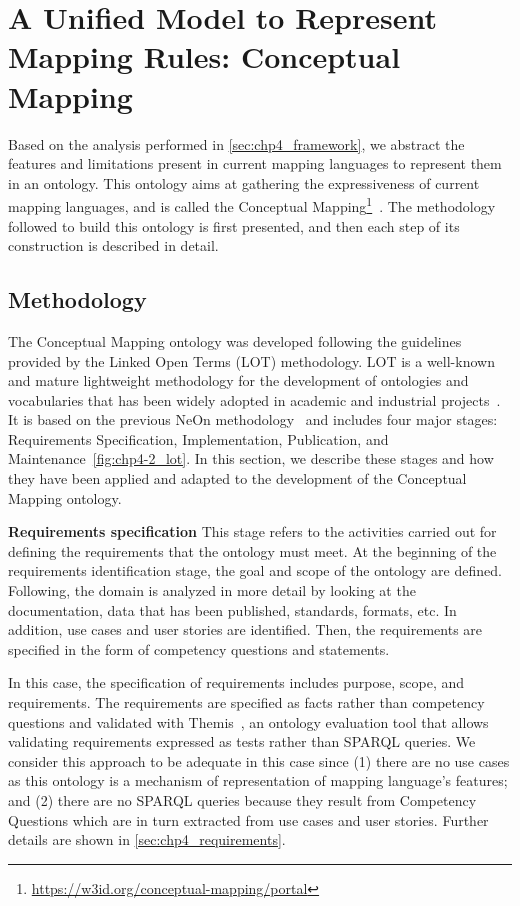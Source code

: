 \section{A Unified Model to Represent Mapping Rules: Conceptual Mapping}
\label{sec:chp4_cm_ontology}

Based on the analysis performed in \cref{sec:chp4_framework}, we abstract the features and limitations present in current mapping languages to represent them in an ontology. This ontology aims at gathering the expressiveness of current mapping languages, and is called the Conceptual Mapping\footnote{\label{foot:cmportal}\url{https://w3id.org/conceptual-mapping/portal}}~\parencite{iglesias2022cm}. The methodology followed to build this ontology is first presented, and then each step of its construction is described in detail.

\subsection{Methodology}
The Conceptual Mapping ontology was developed following the guidelines provided by the Linked Open Terms (LOT) methodology. LOT is a well-known and mature lightweight methodology for the development of ontologies and vocabularies that has been widely adopted in academic and industrial projects~\parencite{poveda2022lot}. It is based on the previous NeOn methodology~\parencite{suarez2015neon} and includes four major stages: Requirements Specification, Implementation, Publication, and Maintenance~\cref{fig:chp4-2_lot}. In this section, we describe these stages and how they have been applied and adapted to the development of the Conceptual Mapping ontology.

\noindent\textbf{Requirements specification}
This stage refers to the activities carried out for defining the requirements that the ontology must meet. At the beginning of the requirements identification stage, the goal and scope of the ontology are defined. Following, the domain is analyzed in more detail by looking at the documentation, data that has been published, standards, formats, etc. In addition, use cases and user stories are identified. Then, the requirements are specified in the form of competency questions and statements. 

In this case, the specification of requirements includes purpose, scope, and requirements. The requirements are specified as facts rather than competency questions and validated with Themis~\parencite{fernandez2021themis}, an ontology evaluation tool that allows validating requirements expressed as tests rather than SPARQL queries. We consider this approach to be adequate in this case since (1) there are no use cases as this ontology is a mechanism of representation of  mapping language's features; and (2) there are no SPARQL queries because they result from Competency Questions which are in turn extracted from use cases and user stories. Further details are shown in \cref{sec:chp4_requirements}.

